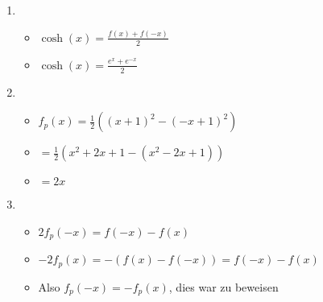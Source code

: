 \item
\begin{enumerate}

\item
\begin{itemize}
\item $\cosh(x) = \frac{f(x)+f(-x)}{2}$
\item $\cosh(x) = \frac{e^x+e^{-x}}{2}$
\end{itemize}

\item
\begin{itemize}
\item $f_p(x) = \frac{1}{2} ((x+1)^2-(-x+1)^2)$
\item $ = \frac{1}{2} (x^2+2x+1-(x^2-2x+1))$
\item $ = 2x$
\end{itemize}

\item
\begin{itemize}
\item $2f_p(-x) = f(-x)-f(x)$
\item $-2f_p(x) = -(f(x)-f(-x)) = f(-x)-f(x)$
\item Also $f_p(-x) = -f_p(x)$, dies war zu beweisen 
\end{itemize}

\end{enumerate}

